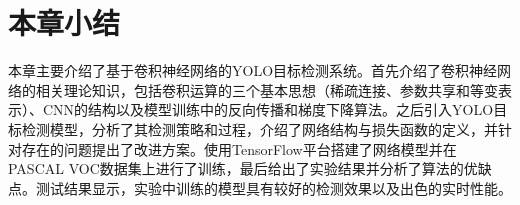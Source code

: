 \section{本章小结}
本章主要介绍了基于卷积神经网络的YOLO目标检测系统。首先介绍了卷积神经网络的相关理论知识，包括卷积运算的三个基本思想（稀疏连接、参数共享和等变表示）、CNN的结构以及模型训练中的反向传播和梯度下降算法。之后引入YOLO目标检测模型，分析了其检测策略和过程，介绍了网络结构与损失函数的定义，并针对存在的问题提出了改进方案。使用TensorFlow平台搭建了网络模型并在PASCAL VOC数据集上进行了训练，最后给出了实验结果并分析了算法的优缺点。测试结果显示，实验中训练的模型具有较好的检测效果以及出色的实时性能。






